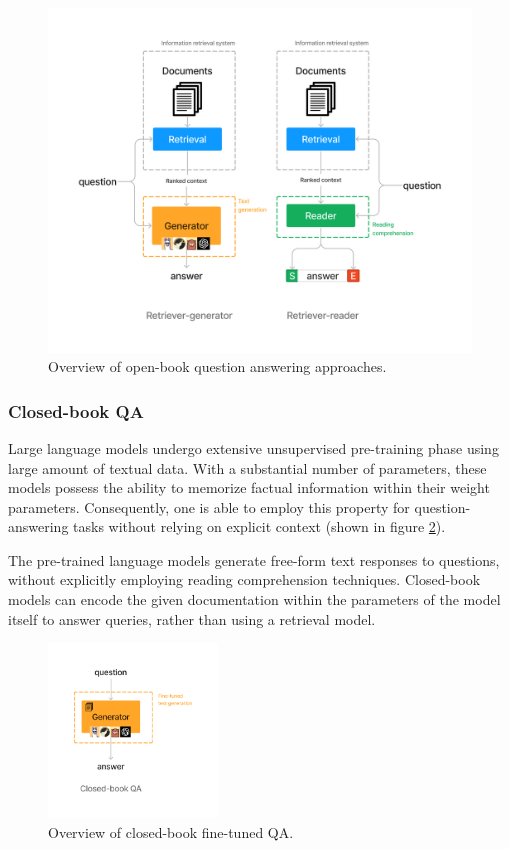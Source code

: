 \documentclass[a4paper,12pt]{article}
\begin{document}
\begin{figure}[htbp]
	\centering
	\includegraphics[width=0.8\linewidth]{figures/openbook.png}
	\caption{Overview of open-book question answering approaches.}
	\label{fig:openbook}
\end{figure}

\subsubsection{Closed-book QA}
Large language models undergo extensive unsupervised pre-training phase using large amount of textual data. With a substantial number of parameters, these models possess the ability to memorize factual information within their weight parameters. Consequently, one is able to employ this property for question-answering tasks without relying on explicit context (shown in figure \ref{fig:closedbook}). 

The pre-trained language models generate free-form text responses to questions, without explicitly employing reading comprehension techniques.
Closed-book models can encode the given documentation within the parameters of the model itself to answer queries, rather than using a retrieval model.

\begin{figure}
	\begin{center}
		\includegraphics[width=0.4\textwidth]{figures/closedbook.png}
	\end{center}
	\caption{Overview of closed-book fine-tuned QA.}
	\label{fig:closedbook}
\end{figure}
\end{document}
